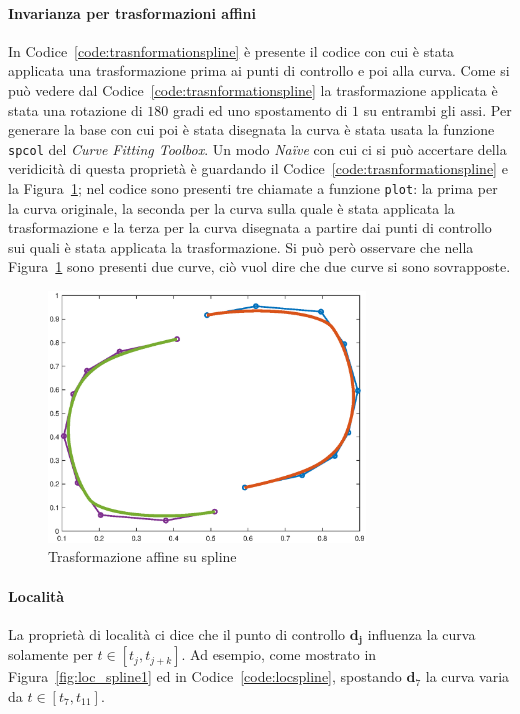 \documentclass[a4paper, 10pt]{article}
\begin{document}
\paragraph{Invarianza per trasformazioni affini} In Codice~\ref{code:trasnformationspline} è 
presente il codice con cui è stata applicata una trasformazione
prima ai punti di controllo e poi alla curva. Come si può vedere dal 
Codice~\ref{code:trasnformationspline} la 
trasformazione applicata è stata una rotazione di $180$ gradi
ed uno spostamento di $1$ su entrambi gli assi. Per generare la base con cui poi è 
stata disegnata la curva è stata usata la funzione \texttt{spcol} del \textit{Curve Fitting Toolbox}.
Un modo \textit{Naïve} con cui ci si può accertare della veridicità di questa proprietà è 
guardando il Codice~\ref{code:trasnformationspline} e la Figura~\ref{fig:trasformationspline}; nel codice sono presenti 
tre chiamate a funzione \texttt{plot}: la prima per la curva originale, la seconda per la curva sulla quale è
stata applicata la trasformazione e la terza per la curva disegnata a partire dai punti di controllo
sui quali è stata applicata la trasformazione. Si può però osservare che nella Figura~\ref{fig:trasformationspline} sono presenti due curve, 
ciò vuol dire che
due curve si sono sovrapposte.
\begin{figure}[]
  \centering
  \includegraphics[width=0.75\textwidth]{figure/transformation_spline.eps}
  \caption{Trasformazione affine su spline}
  \label{fig:trasformationspline}
\end{figure} 




\paragraph{Località} La proprietà di località ci dice  che il punto di controllo $\mathbf{d_j}$ influenza la curva solamente per $t \in [t_j, t_{j+k}]$. 
Ad esempio, come mostrato in Figura~\ref{fig:loc_spline1} ed in Codice~\ref{code:locspline}, spostando $\mathbf{d}_7$ la curva varia da $t \in [t_7, t_{11}]$. 
\end{document}
